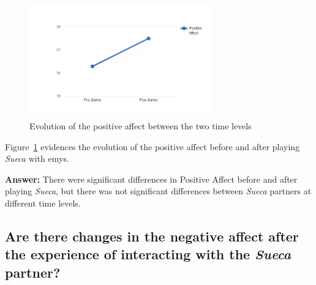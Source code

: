 \begin{figure}[h!]
  \centering
    \includegraphics[width=0.7\textwidth]{./img/6/positiveAffect}
  \caption{Evolution of the positive affect between the two time levels}
\label{fig:positiveAffect}
\end{figure}

Figure~\ref{fig:positiveAffect} evidences the evolution of the positive affect before and after playing \emph{Sueca} with \ac{emys}.

\textbf{Answer:} There were significant differences in Positive Affect before and after playing \emph{Sueca}, but there was not significant differences between \emph{Sueca} partners at different time levels.

\subsection*{Are there changes in the negative affect after the experience of interacting with the \emph{Sueca} partner?}

\clearpage
